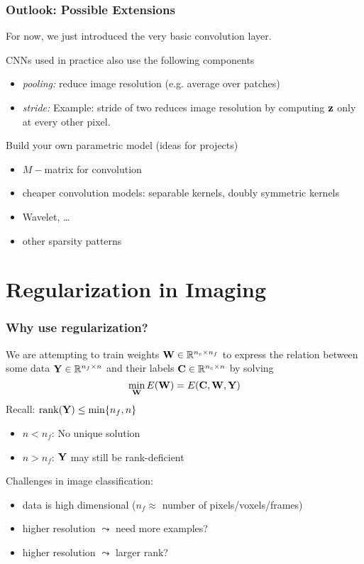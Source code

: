 \documentclass[12pt,fleqn,handout]{beamer}
\begin{document}
\begin{frame}\frametitle{Outlook: Possible Extensions}
	For now, we just introduced the very basic convolution layer. 
	
	CNNs used in practice also use the following components 
	\begin{itemize}
		\item \emph{pooling:} reduce image resolution (e.g.  average over patches)
		\item \emph{stride:} Example: stride of two reduces image resolution by computing ${\bf z}$ only at every other pixel. 
	\end{itemize}
	
	\bigskip
	
	Build your own parametric model (ideas for projects)
	\begin{itemize}
		\item $M-$matrix for convolution
		\item cheaper convolution models: separable kernels, doubly symmetric kernels
		\item Wavelet, \ldots
		\item other sparsity patterns
	\end{itemize}
	
\end{frame}

\section{Regularization in Imaging} %
\label{sec:regularization_in_imaging}

\begin{frame}[fragile]\frametitle{Why use regularization?}
We are attempting to train weights ${\bf W} \in \mathbb{R}^{n_c \times n_f}$ to express the relation between some data ${\bf Y} \in \mathbb{R}^{n_f \times n}$ and their labels ${\bf C} \in \mathbb{R}^{n_c \times n}$ by solving
$$
	 \min_{\bf W}  E({\bf W}) =  E({\bf C},{\bf W},{\bf Y})
$$ 
Recall: ${\rm rank}({\bf Y}) \leq \min\{n_f,n\}$
\begin{itemize}
\item $n < n_f$: No unique solution
\item $n > n_f$: ${\bf Y}$ may still be rank-deficient
\end{itemize}

\pause

Challenges in image classification: 
\begin{itemize}
	\item data is high dimensional ($n_f \approx$ number of pixels/voxels/frames)
	\item higher resolution $\leadsto$ need more examples? 
	\item higher resolution $\leadsto$ larger rank?
\end{itemize}

\end{frame}
\end{document}
